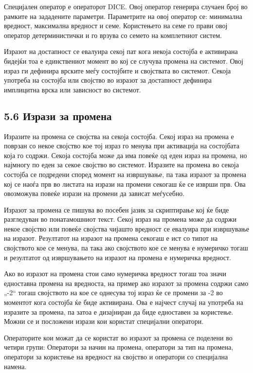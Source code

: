 Специјален оператор е операторот DICE. Овој оператор генерира случаен број во рамките на зададените параметри. Параметрите на овој оператор се: минимална вредност, максимална вредност и семе. Користењето на семе го прави овој оператор детерминистички и го врзува со семето на комплетниот систем.

Изразот на достапност се евалуира секој пат кога некоја состојба е активирана бидејќи тоа е единствениот момент во кој се случува промена на системот. Овој израз ги дефинира врските меѓу состојбите и својствата во системот. Секоја употреба на состојба или својство во изразот за достапност дефинира имплицитна врска или зависност во системот.

\subsection{5.6 Изрази за промена}

Изразите на промена се својства на секоја состојба. Секој израз на промена е поврзан со некое својство кое тој израз го менува при активација на состојбата која го содржи. Секоја состојба може да има повеќе од еден израз на промена, но најмногу по еден за секое својство во системот. Изразите на промена во секоја состојба се подредени според момент на извршување, па така изразот за промена кој се наоѓа прв во листата на изрази на промени секогаш ќе се изврши прв. Ова овозможува повеќе изрази на промени да зависат меѓусебно.

Изразот за промена се пишува во посебен јазик за скриптирање кој ќе биде разгледуван во понатамошниот текст. Секој израз на промена може да содржи некое својство или повеќе својства чијашто вредност се евалуира при извршување на изразот. Резултатот на изразот на промена секогаш е ист со типот на својството кое се менува, па така ако својството кое се менува е нумеричко тогаш и резултатот од извршувањето на изразот на промена е нумеричка вредност.

Ако во изразот на промена стои само нумеричка вредност тогаш тоа значи едноставна промена на вредноста, на пример ако изразот за промена содржи само „-2“ тогаш својството на кое се однесува тој израз ќе се промени за -2 во моментот кога состојба ќе биде активирана. Ова е најчест случај на употреба на изразите за промена, па затоа е дизајниран да биде едноставен за користење. Можни се и посложени изрази кои користат специјални оператори.

Операторите кои можат да се користат во изразот за промена се поделени во четири групи: Оператори за начин на промена, оператори за тип на промена, оператори за користење на вредност на својство и оператори со специјална намена.

